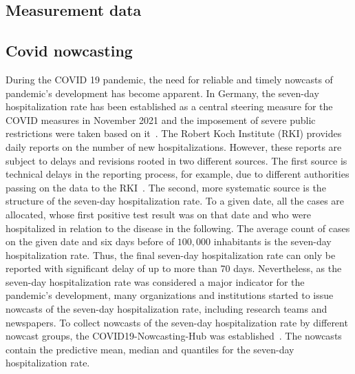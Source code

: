 
\subsection{Measurement data} \label{sec:application_measurement}

\newpage
\subsection{Covid nowcasting} \label{sec:application-covid}

During the COVID 19 pandemic, the need for reliable and timely nowcasts of pandemic's development has become apparent.
In Germany, the seven-day hospitalization rate has been established as a central steering measure for the COVID measures in November 2021 and the imposement of severe public restrictions were taken based on it~\parencite{RobertKochInstitute2021}.
The Robert Koch Institute (RKI) provides daily reports on the number of new hospitalizations.
However, these reports are subject to delays and revisions rooted in two different sources.
The first source is technical delays in the reporting process, for example, due to different authorities passing on the data to the RKI~\parencite{RobertKochInstitute2024}.
The second, more systematic source is the structure of the seven-day hospitalization rate.
To a given date, all the cases are allocated, whose first positive test result was on that date and who were hospitalized in relation to the disease in the following.
The average count of cases on the given date and six days before of $100,000$ inhabitants is the seven-day hospitalization rate.
Thus, the final seven-day hospitalization rate can only be reported with significant delay of up to more than 70 days.
Nevertheless, as the seven-day hospitalization rate was considered a major indicator for the pandemic's development, many organizations and institutions started to issue nowcasts of the seven-day hospitalization rate, including research teams and newspapers.
To collect nowcasts of the seven-day hospitalization rate by different nowcast groups, the COVID19-Nowcasting-Hub was established~\parencite{ChairOfEconometricsAndStatisticsAtKarlsruheInstituteOfTechnology2024}.
The nowcasts contain the predictive mean, median and quantiles for the seven-day hospitalization rate.

